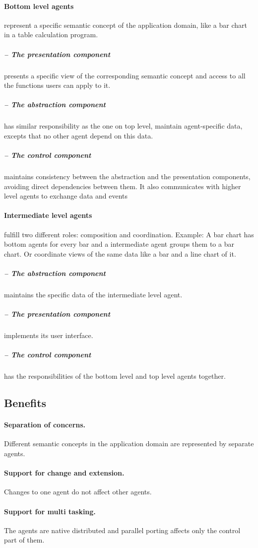 \documentclass[a4paper,11pt,twocolumn]{report}
\begin{document}
    \paragraph{Bottom level agents} represent a specific semantic concept of
    the application domain, like a bar chart in a table calculation program.
    \subparagraph{-- The presentation component} presents a specific view of
    the corresponding semantic concept and access to all the functions users
    can apply to it.
    \subparagraph{-- The abstraction component} has similar responsibility as
    the one on top level, maintain agent-specific data, excepts that no other
    agent depend on this data.
    \subparagraph{-- The control component} maintains consistency between the
    abstraction and the presentation components, avoiding direct dependencies
    between them. It also communicates with higher level agents to exchange
    data and events
    \paragraph{Intermediate level agents} fulfill two different roles:
    composition and coordination. Example: A bar chart has bottom agents for
    every bar and a intermediate agent groups them to a bar chart. Or
    coordinate views of the same data like a bar and a line chart of it.
    \subparagraph{-- The abstraction component} maintains the specific data of
    the intermediate level agent.
    \subparagraph{-- The presentation component} implements its user interface.
    \subparagraph{-- The control component} has the responsibilities of
    the bottom level and top level agents together.
    \subsection{Benefits}
    \paragraph{Separation of concerns.} Different semantic concepts in the
    application domain are represented by separate agents.
    \paragraph{Support for change and extension.} Changes to one agent do not
    affect other agents.
    \paragraph{Support for multi tasking.} The agents are native distributed
    and parallel porting affects only the control part of them.
\end{document}
